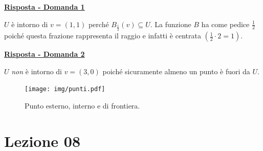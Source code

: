 \documentclass[a4paper]{article}
\begin{document}
	\noindent
	\textcolor{Green4}{\textbf{\underline{Risposta - Domanda 1}}}\newline
	
	\noindent
	$U$ è intorno di $v = \left(1,1\right)$ perché $B_{\frac{1}{2}}\left(v\right) \subseteq U$. La funzione $B$ ha come pedice $\frac{1}{2}$ poiché questa frazione rappresenta il raggio e infatti è centrata $\left(\frac{1}{2} \cdot 2 = 1\right)$.\newline
	
	\noindent
	\textcolor{Green4}{\textbf{\underline{Risposta - Domanda 2}}}\newline
	
	\noindent
	$U$ \emph{non} è intorno di $v = \left(3,0\right)$ poiché sicuramente almeno un punto è fuori da $U$.
	
	\newpage
	
	\noindent{}

	\begin{figure}[!htp]
		\centering
		\texttt{[image: img/punti.pdf]}
		\caption{Punto esterno, interno e di frontiera.}
	\end{figure}

	\newpage
	
	\section{Lezione 08}
\end{document}
